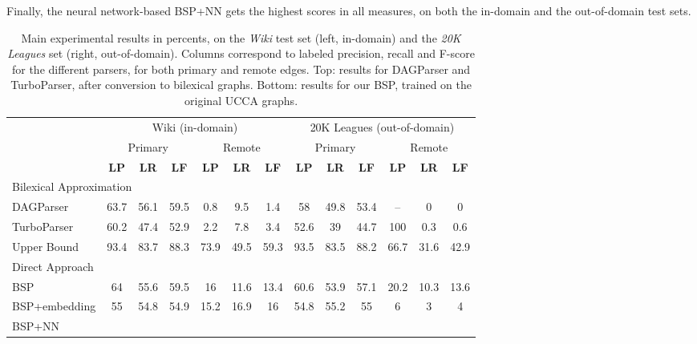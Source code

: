 \documentclass[11pt]{article}
\begin{document}
Finally, the neural network-based BSP+NN gets the highest scores in all measures, on both
the in-domain and the out-of-domain test sets.

\begin{table*}[ht]
\begin{adjustbox}{width=\textwidth}
\begin{tabular}{l|ccc|ccc||ccc|ccc}
& \multicolumn{6}{c||}{Wiki (in-domain)} & \multicolumn{6}{c}{20K Leagues (out-of-domain)} \\
& \multicolumn{3}{c|}{Primary} & \multicolumn{3}{c||}{Remote}
& \multicolumn{3}{c|}{Primary} & \multicolumn{3}{c}{Remote} \\
& \textbf{LP} & \textbf{LR} & \textbf{LF} & \textbf{LP} & \textbf{LR} & \textbf{LF}
& \textbf{LP} & \textbf{LR} & \textbf{LF} & \textbf{LP} & \textbf{LR} & \textbf{LF} \\
\hline
\multicolumn{4}{l}{\rule{0pt}{2ex} \footnotesize Bilexical Approximation} \\
DAGParser
& 63.7 & 	56.1	 & 59.5	 & 0.8	 & 9.5	 &  1.4
& 58	 & 49.8	 & 53.4 & -- & 0 & 0 \\
TurboParser
& 60.2	 & 47.4	 & 52.9	 & 2.2	 & 7.8	 &  3.4
& 52.6	 & 39	 & 44.7	 & 100	 & 0.3	 & 0.6 \\
Upper Bound %
& 93.4 & 83.7 & 88.3 & 73.9 & 49.5 & 59.3
& 93.5 & 83.5 & 88.2 & 66.7 & 31.6 & 42.9 \\
\hline
\multicolumn{4}{l}{\rule{0pt}{2ex} \footnotesize Direct Approach} \\
BSP
& 64 & 55.6 & 59.5 & 16 & 11.6 & 13.4 
& 60.6 & 53.9 & 57.1 & 20.2 & 10.3 & 13.6 \\
BSP+embedding 
& 55 & 54.8 & 54.9 & 15.2 & 16.9 & 16 
& 54.8 & 55.2 & 55 & 6 & 3 & 4 \\
BSP+NN 
&  &  &  &  &  &  
&  &  &  &  &  & 
\end{tabular}
\end{adjustbox}
\caption{\label{table:results}
  Main experimental results in percents, on the \textit{Wiki} test set (left, in-domain)
  and the \textit{20K Leagues} set (right, out-of-domain).
  Columns correspond to labeled precision, recall and F-score for the different parsers,
  for both primary and remote edges.
  Top: results for DAGParser and TurboParser, after conversion to bilexical graphs.
  Bottom: results for our BSP, trained on the original UCCA graphs.
}
\end{table*}
\end{document}
